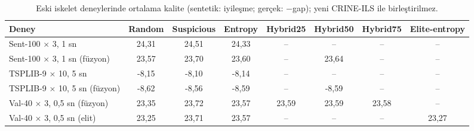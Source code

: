 \begin{table}[!htbp]
 \centering\small
 \setlength{\tabcolsep}{4pt}
 \caption{Eski iskelet deneylerinde ortalama kalite (sentetik: iyileşme; gerçek: $-$gap); yeni CRINE-ILS ile birleştirilmez.}
 \label{tab:entropy-legacy}
\begin{tabularx}{\textwidth}{@{\extracolsep{\fill}}>{\raggedright\arraybackslash}Xccccccc}
\toprule
Deney & Random & Suspicious & Entropy & Hybrid25 & Hybrid50 & Hybrid75 & Elite-entropy \\
\midrule
Sent-100 $\times$ 3, 1 sn & 24,31 & 24,51 & 24,33 & -- & -- & -- & -- \\
Sent-100 $\times$ 3, 1 sn (füzyon) & 23,57 & 23,70 & 23,60 & -- & 23,64 & -- & -- \\
TSPLIB-9 $\times$ 10, 5 sn & -8,15 & -8,10 & -8,14 & -- & -- & -- & -- \\
TSPLIB-9 $\times$ 10, 5 sn (füzyon) & -8,62 & -8,56 & -8,59 & -- & -8,59 & -- & -- \\
Val-40 $\times$ 3, 0,5 sn (füzyon) & 23,35 & 23,72 & 23,57 & 23,59 & 23,59 & 23,58 & -- \\
Val-40 $\times$ 3, 0,5 sn (elit) & 23,25 & 23,71 & 23,57 & -- & -- & -- & 23,27 \\
\bottomrule
\end{tabularx}
\end{table}
